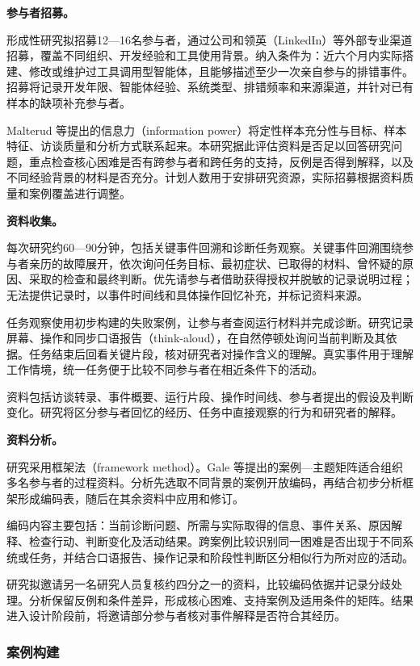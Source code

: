 \noindent\textbf{参与者招募。}

形成性研究拟招募12—16名参与者，通过公司和领英（LinkedIn）等外部专业渠道招募，覆盖不同组织、开发经验和工具使用背景。纳入条件为：近六个月内实际搭建、修改或维护过工具调用型智能体，且能够描述至少一次亲自参与的排错事件。招募将记录开发年限、智能体经验、系统类型、排错频率和来源渠道，并针对已有样本的缺项补充参与者。

Malterud 等\cite{malterud2016information}提出的信息力（information power）将定性样本充分性与目标、样本特征、访谈质量和分析方式联系起来。本研究据此评估资料是否足以回答研究问题，重点检查核心困难是否有跨参与者和跨任务的支持，反例是否得到解释，以及不同经验背景的材料是否充分。计划人数用于安排研究资源，实际招募根据资料质量和案例覆盖进行调整。

\noindent\textbf{资料收集。}

每次研究约60—90分钟，包括关键事件回溯和诊断任务观察。关键事件回溯围绕参与者亲历的故障展开，依次询问任务目标、最初症状、已取得的材料、曾怀疑的原因、采取的检查和最终判断。优先请参与者借助获得授权并脱敏的记录说明过程；无法提供记录时，以事件时间线和具体操作回忆补充，并标记资料来源。

任务观察使用初步构建的失败案例，让参与者查阅运行材料并完成诊断。研究记录屏幕、操作和同步口语报告（think-aloud），在自然停顿处询问当前判断及其依据。任务结束后回看关键片段，核对研究者对操作含义的理解。真实事件用于理解工作情境，统一任务便于比较不同参与者在相近条件下的活动。

资料包括访谈转录、事件概要、运行片段、操作时间线、参与者提出的假设及判断变化。研究将区分参与者回忆的经历、任务中直接观察的行为和研究者的解释。

\noindent\textbf{资料分析。}

研究采用框架法（framework method）。Gale 等\cite{gale2013framework}提出的案例—主题矩阵适合组织多名参与者的过程资料。分析先选取不同背景的案例开放编码，再结合初步分析框架形成编码表，随后在其余资料中应用和修订。

编码内容主要包括：当前诊断问题、所需与实际取得的信息、事件关系、原因解释、检查行动、判断变化及活动结果。跨案例比较识别同一困难是否出现于不同系统或任务，并结合口语报告、操作记录和阶段性判断区分相似行为所对应的活动。

研究拟邀请另一名研究人员复核约四分之一的资料，比较编码依据并记录分歧处理。分析保留反例和条件差异，形成核心困难、支持案例及适用条件的矩阵。结果进入设计阶段前，将邀请部分参与者核对事件解释是否符合其经历。

\subsubsection{案例构建}

